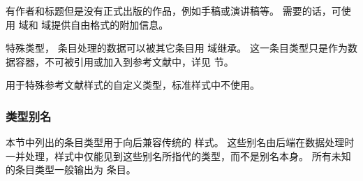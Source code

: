 \begin{typelist}


有作者和标题但是没有正式出版的作品，例如手稿或演讲稿等。
需要的话，可使用  域和  域提供自由格式的附加信息。




特殊类型， 条目处理的数据可以被其它条目用  域继承。
这一条目类型只是作为数据容器，不可被引用或加入到参考文献中，详见 节。



用于特殊参考文献样式的自定义类型，标准样式中不使用。

\end{typelist}

\subsubsection{类型别名}
\label{bib:typ:als}


本节中列出的条目类型用于向后兼容传统的 \BibTeX 样式。
这些别名由后端在数据处理时一并处理，样式中仅能见到这些别名所指代的类型，而不是别名本身。
所有未知的条目类型一般输出为  条目。

